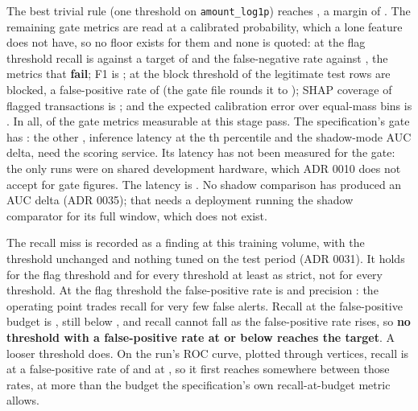 The best trivial rule (one threshold on \texttt{amount\_log1p}) reaches \nGateTrivial{}, a margin
of \nGateTrivialMargin{}. The remaining gate metrics are read at a calibrated probability, which a
lone feature does not have, so no floor exists for them and none is quoted: at the flag threshold
recall is \nGateRecallSix{} \nGateRecallSixci{} against a target of \nTargetRecall{} and the false-negative rate \nGateFNR{} against \nTargetFNR{}, the \nGateFailed{} metrics that
\textbf{fail}; F1 is
\nGateFone{} \nGateFoneci{}; at the block threshold \nGateFPRBlockCount{} of the \nTestLegit{}
legitimate test rows are blocked, a false-positive rate of \nGateFPRBlockPct{} (the gate file rounds it to \nGateFPRBlock{}); SHAP coverage of flagged transactions is \nGateShapCov{}; and
the expected calibration error over \nEceBins{} equal-mass bins is \nGateECE{}. In all, \nGatePassed{} of the
\nGateMeasured{} gate metrics measurable at this stage pass. The specification's gate has
\nGateTotal{}: the other \nGateUnmeasured{}, inference latency at the \nPctlTail{}th percentile and the
shadow-mode AUC delta, need the scoring service. Its latency has not been measured for the gate:
the only runs were on shared development hardware, which ADR 0010 does not accept for gate figures.
The latency is . No shadow comparison has produced an AUC delta (ADR 0035);
that needs a deployment running the shadow comparator for its full window, which does not exist.

The recall miss is recorded as a finding at this training volume, with the threshold unchanged and
nothing tuned on the test period (ADR 0031). It holds for the flag threshold and for every
threshold at least as strict, not for every threshold. At the flag threshold the false-positive
rate is \nGateFPRFlag{} and precision \nGatePrecSix{}: the operating point trades recall for very
few false alerts. Recall at the \nFPRBudget{} false-positive budget is \nGateRecallFPR{}, still
below \nTargetRecall{}, and recall cannot fall as the false-positive rate rises, so \textbf{no
threshold with a false-positive rate at or below \nFPRBudget{} reaches the target}. A looser
threshold does. On the run's ROC curve, plotted through \nRocPoints{} vertices, recall is
\nRocLowRecall{} at a false-positive rate of \nRocLowFPR{} and \nRocHighRecall{} at \nRocHighFPR{},
so it first reaches \nTargetRecall{} somewhere between those rates, at more than the budget
the specification's own recall-at-budget metric allows.

